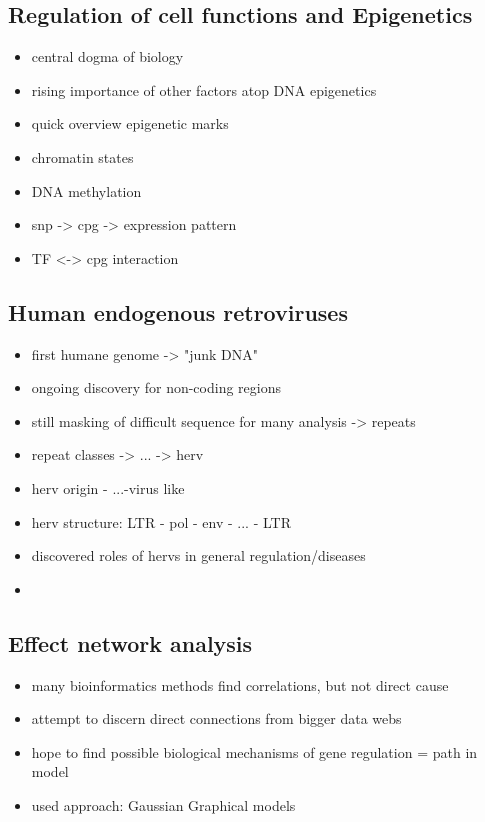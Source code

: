 \documentclass[a4paper,12pt]{article}
\begin{document}
\subsection{Regulation of cell functions and Epigenetics}
\begin{itemize}
\item central dogma of biology
\item rising importance of other factors atop DNA \textrightarrow epigenetics
\item quick overview epigenetic marks
\item chromatin states
\item DNA methylation 
\item snp -> cpg -> expression pattern
\item TF <-> cpg interaction
\end{itemize}


\subsection{Human endogenous retroviruses}
\begin{itemize}
\item first humane genome -> "junk DNA"
\item ongoing discovery for non-coding regions
\item still masking of difficult sequence for many analysis -> repeats
\item repeat classes -> ... -> herv
\item herv origin - ...-virus like 
\item herv structure: LTR - pol - env - ... - LTR
\item discovered roles of hervs in general regulation/diseases
\item 
\end{itemize}

\subsection{Effect network analysis}
\begin{itemize}
\item many bioinformatics methods find correlations, but not direct cause
\item attempt to discern direct connections from bigger data webs
\item hope to find possible biological mechanisms of gene regulation = path in model 
\item used approach: Gaussian Graphical models
\end{itemize}
\end{document}

